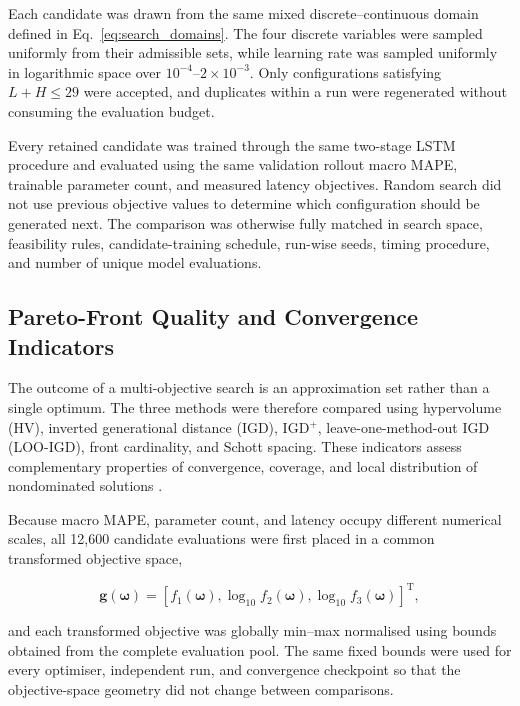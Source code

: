 \documentclass[a4paper,fleqn]{cas-sc}
\begin{document}
Each candidate was drawn from the same mixed discrete--continuous domain defined in Eq.~\eqref{eq:search_domains}. The four discrete variables were sampled uniformly from their admissible sets, while learning rate was sampled uniformly in logarithmic space over $10^{-4}$--$2\times10^{-3}$. Only configurations satisfying $L+H\leq29$ were accepted, and duplicates within a run were regenerated without consuming the evaluation budget.

Every retained candidate was trained through the same two-stage LSTM procedure and evaluated using the same validation rollout macro MAPE, trainable parameter count, and measured latency objectives. Random search did not use previous objective values to determine which configuration should be generated next. The comparison was otherwise fully matched in search space, feasibility rules, candidate-training schedule, run-wise seeds, timing procedure, and number of unique model evaluations.


\subsection{Pareto-Front Quality and Convergence Indicators}
\label{sec:pareto_indicators}

The outcome of a multi-objective search is an approximation set rather than a single optimum. The three methods were therefore compared using hypervolume (HV), inverted generational distance (IGD), IGD$^{+}$, leave-one-method-out IGD (LOO-IGD), front cardinality, and Schott spacing. These indicators assess complementary properties of convergence, coverage, and local distribution of nondominated solutions \cite{zitzler2003performance,ishibuchi2019indicators,schott1995spacing}.

Because macro MAPE, parameter count, and latency occupy different numerical scales, all 12,600 candidate evaluations were first placed in a common transformed objective space,

\begin{equation}
\mathbf{g}(\boldsymbol{\omega})
=
\left[
f_1(\boldsymbol{\omega}),
\log_{10} f_2(\boldsymbol{\omega}),
\log_{10} f_3(\boldsymbol{\omega})
\right]^{\mathrm{T}},
\label{eq:indicator_transform}
\end{equation}

and each transformed objective was globally min--max normalised using bounds obtained from the complete evaluation pool. The same fixed bounds were used for every optimiser, independent run, and convergence checkpoint so that the objective-space geometry did not change between comparisons.
\end{document}
